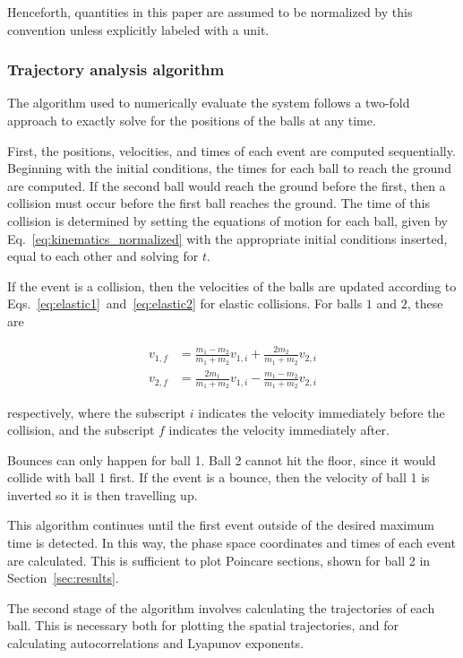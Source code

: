 \documentclass[pra,twocolumn,showpacs,amsmath,amssymb, aps, 10pt]{revtex4-1}
\begin{document}
Henceforth, quantities in this paper are assumed to be normalized by this convention
unless explicitly labeled with a unit.


\subsubsection{Trajectory analysis algorithm}

The algorithm used to numerically evaluate the system follows a two-fold approach
to exactly solve for the positions of the balls at any time.

First, the positions, velocities, and times of each event are
computed sequentially.
Beginning with the initial conditions, the times for each
ball to reach the ground are computed. If the second ball would reach the ground
before the first, then a collision must occur before the first ball reaches the
ground. The time of this collision is determined by setting the equations of
motion for each ball, given by Eq.~\ref{eq:kinematics_normalized} with the
appropriate initial conditions inserted, equal to each
other and solving for $t$.

If the event is a collision, then the velocities of the balls are updated according
to Eqs.~\ref{eq:elastic1}~and~\ref{eq:elastic2} for elastic collisions.
For balls $1$ and $2$, these are

\begin{align}
  v_{1,f} &= \frac{m_1-m_2}{m_1+m_2}v_{1,i} + \frac{2 m_2}{m_1+m_2}v_{2,i} \label{eq:elastic1}\\
  v_{2,f} &= \frac{2 m_1}{m_1+m_2}v_{1,i} - \frac{m_1-m_2}{m_1+m_2}v_{2,i}
  \label{eq:elastic2}
\end{align}

respectively, where the subscript $i$ indicates the velocity immediately before the collision,
and the subscript $f$ indicates the velocity immediately after.

Bounces can only happen for ball 1. Ball 2 cannot hit the floor, since it would
collide with ball 1 first. If the event is a bounce, then the velocity of ball 1
is inverted so it is then travelling up.

This algorithm continues until the first event outside of the desired maximum
time is detected. In this way, the phase space coordinates and times of each
event are calculated.
This is sufficient to plot Poincare sections, shown for ball 2 in
Section~\ref{sec:results}.

The second stage of the algorithm involves calculating the trajectories of each
ball. This is necessary both for plotting the spatial trajectories, and for
calculating autocorrelations and Lyapunov exponents.
\end{document}
